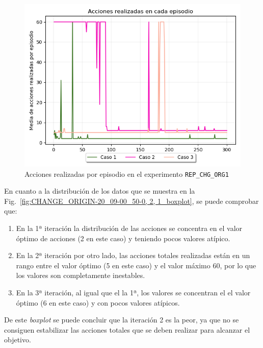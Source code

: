 \begin{figure}
    \centering
    \includegraphics[scale=0.4]{cap5_experimentacion/images/CHANGE_ORIGIN-20_09-00_50-0, 2, 1_acciones.png}
    \caption{Acciones realizadas por episodio en el experimento \texttt{REP\_CHG\_ORG1}}
    \label{fig:CHANGE_ORIGIN-20_09-00_50-0, 2, 1_acciones}
\end{figure}

En cuanto a la distribución de los datos que se muestra en la Fig.~\ref{fig:CHANGE_ORIGIN-20_09-00_50-0, 2, 1_boxplot}, se puede comprobar que: 
\begin{enumerate}
    \item En la 1ª iteración la distribución de las acciones se concentra en el valor óptimo de acciones (2 en este caso) y teniendo pocos valores atípico.
    \item En la 2ª iteración por otro lado, las acciones totales realizadas están en un rango entre el valor óptimo (5 en este caso) y el valor máximo 60, por lo que los valores son completamente inestables.
    \item En la 3ª iteración, al igual que el la 1ª, los valores se concentran el el valor óptimo (6 en este caso) y con pocos valores atípicos.  
\end{enumerate}

De este \textit{boxplot} se puede concluir que la iteración 2 es la peor, ya que no se consiguen estabilizar las acciones totales que se deben realizar para alcanzar el objetivo. \\

